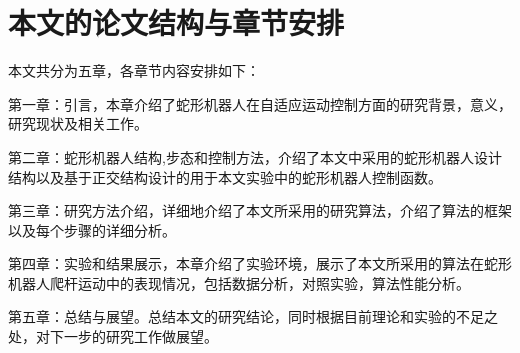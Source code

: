 \section{本文的论文结构与章节安排}

\label{sec:arrangement}
本文共分为五章，各章节内容安排如下：

第一章：引言，本章介绍了蛇形机器人在自适应运动控制方面的研究背景，意义，研究现状及相关工作。

第二章：蛇形机器人结构,步态和控制方法，介绍了本文中采用的蛇形机器人设计结构以及基于正交结构设计的用于本文实验中的蛇形机器人控制函数。

第三章：研究方法介绍，详细地介绍了本文所采用的研究算法，介绍了算法的框架以及每个步骤的详细分析。

第四章：实验和结果展示，本章介绍了实验环境，展示了本文所采用的算法在蛇形机器人爬杆运动中的表现情况，包括数据分析，对照实验，算法性能分析。

第五章：总结与展望。总结本文的研究结论，同时根据目前理论和实验的不足之处，对下一步的研究工作做展望。

